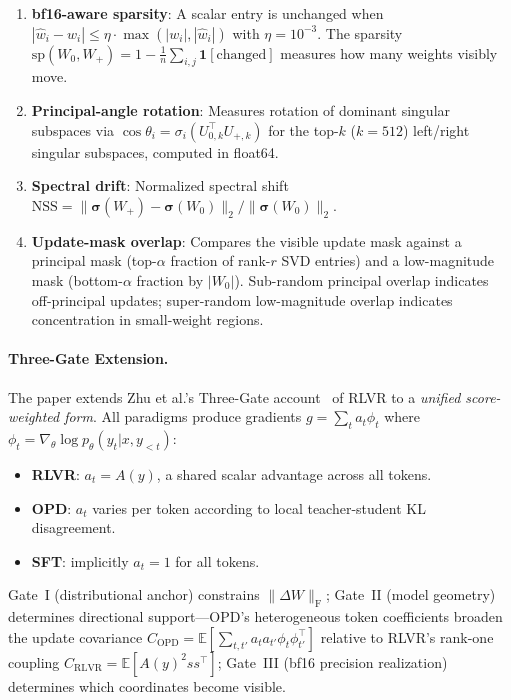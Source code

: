 \documentclass[11pt,a4paper]{article}
\begin{document}
\begin{enumerate}
\item \textbf{bf16-aware sparsity}: A scalar entry is unchanged when $|\hat{w}_i - w_i| \leq \eta \cdot \max(|w_i|, |\hat{w}_i|)$ with $\eta = 10^{-3}$. The sparsity $\mathrm{sp}(W_0, W_+) = 1 - \frac{1}{n}\sum_{i,j}\mathbf{1}[\text{changed}]$ measures how many weights visibly move.
\item \textbf{Principal-angle rotation}: Measures rotation of dominant singular subspaces via $\cos\theta_i = \sigma_i(U_{0,k}^\top U_{+,k})$ for the top-$k$ ($k\!=\!512$) left/right singular subspaces, computed in float64.
\item \textbf{Spectral drift}: Normalized spectral shift $\mathrm{NSS} = \|\boldsymbol{\sigma}(W_+) - \boldsymbol{\sigma}(W_0)\|_2 / \|\boldsymbol{\sigma}(W_0)\|_2$.
\item \textbf{Update-mask overlap}: Compares the visible update mask against a principal mask (top-$\alpha$ fraction of rank-$r$ SVD entries) and a low-magnitude mask (bottom-$\alpha$ fraction by $|W_0|$). Sub-random principal overlap indicates off-principal updates; super-random low-magnitude overlap indicates concentration in small-weight regions.
\end{enumerate}

\paragraph{Three-Gate Extension.} The paper extends Zhu et al.'s Three-Gate account~\cite{zhu2025path} of RLVR to a \emph{unified score-weighted form}. All paradigms produce gradients $g = \sum_t a_t \phi_t$ where $\phi_t = \nabla_\theta \log p_\theta(y_t | x, y_{<t})$:
\begin{itemize}
\item \textbf{RLVR}: $a_t = A(y)$, a shared scalar advantage across all tokens.
\item \textbf{OPD}: $a_t$ varies per token according to local teacher-student KL disagreement.
\item \textbf{SFT}: implicitly $a_t = 1$ for all tokens.
\end{itemize}
Gate~I (distributional anchor) constrains $\|\Delta W\|_{\mathrm{F}}$; Gate~II (model geometry) determines directional support---OPD's heterogeneous token coefficients broaden the update covariance $C_{\mathrm{OPD}} = \mathbb{E}[\sum_{t,t'} a_t a_{t'} \phi_t \phi_{t'}^\top]$ relative to RLVR's rank-one coupling $C_{\mathrm{RLVR}} = \mathbb{E}[A(y)^2 s s^\top]$; Gate~III (bf16 precision realization) determines which coordinates become visible.
\end{document}
